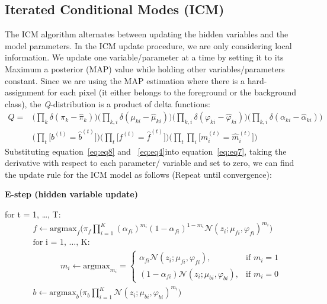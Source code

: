 \documentclass{article} %
\begin{document}
\subsection{Iterated Conditional Modes (ICM)}
\label{icm}
The ICM algorithm alternates between updating the hidden variables and the model parameters. In the ICM update procedure, we are only considering local information. We update one variable/parameter at a time by setting it to its Maximum a posterior (MAP) value while holding other variables/parameters constant. Since we are using the MAP estimation where there is a hard-assignment for each pixel (it either belongs to the foreground or the background class), the \textit{Q}-distribution is a product of delta functions:
\begin{equation} \label{eq:eq8}
\begin{split}
Q = &\Bigg( \prod_{k}\delta(\pi_k-\hat{\pi}_k) \Bigg) \Bigg( \prod_{k,i}\delta(\mu_{ki}-\hat{\mu}_{ki}) \Bigg)\Bigg( \prod_{k,i}\delta(\varphi_{ki}-\hat{\varphi}_{ki}) \Bigg)\Bigg( \prod_{k,i}\delta(\alpha_{ki}-\hat{\alpha}_{ki}) \Bigg) \\
&\Bigg( \prod_{t}\Big[b^{(t)} = \hat{b}^{(t)}\Big] \Bigg)\Bigg( \prod_{t}\Big[f^{(t)} = \hat{f}^{(t)}\Big] \Bigg)\Bigg( \prod_{t}\prod_{i}\Big[m_i^{(t)} = \hat{m}_i^{(t)}\Big] \Bigg)
\end{split}
\end{equation}
Substituting equation~\ref{eq:eq8} and ~\ref{eq:eq4}into equation~\ref{eq:eq7}, taking the derivative with respect to each parameter/ variable and set to zero, we can find the update rule for the ICM model as follows (Repeat until convergence):

\textbf{E-step (hidden variable update)}

for t = 1, \ldots , T:
\begin{align*} 
&f \leftarrow \text{argmax}_{f}\Bigg(\pi_f \prod_{i=1}^K {(\alpha_{fi})}^{m_{i}} {(1-\alpha_{fi})}^{1-m_{i}}\mathcal{N}(z_i;\mu_{fi},\varphi_{fi})^{m_{i}}\Bigg)\\
&\text{for i = 1, \ldots , K: } \\
& \text{ }\text{ }\text{ }\text{ }\text{ }m_i \leftarrow \text{argmax}_{m_i}=\begin{cases}
\alpha_{fi}\mathcal{N}(z_i;\mu_{fi},\varphi_{fi}), & \text{if $m_i = 1$}\\
(1-\alpha_{fi})\mathcal{N}(z_i;\mu_{bi},\varphi_{bi}), & \text{if $m_i = 0$}
\end{cases} \\
&b \leftarrow \text{argmax}_{b}\Bigg(\pi_b \prod_{i=1}^K \mathcal{N}(z_i;\mu_{bi},\varphi_{bi})^{m_{i}}\Bigg)
\end{align*} 
\end{document}
